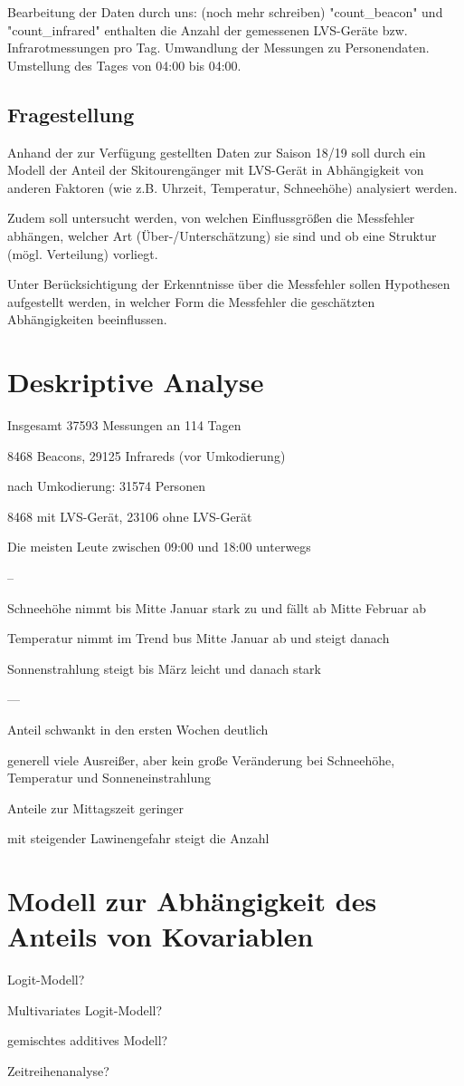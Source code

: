 \documentclass[11pt,a4paper]{report}
\begin{document}
Bearbeitung der Daten durch uns:
(noch mehr schreiben)
"count\_beacon" und "count\_infrared" enthalten die Anzahl der gemessenen LVS-Geräte bzw. Infrarotmessungen pro Tag.
Umwandlung der Messungen zu Personendaten. Umstellung des Tages von 04:00 bis 04:00.

\section{Fragestellung}
	\item Anhand der zur Verfügung gestellten Daten zur Saison 18/19 soll durch ein Modell der Anteil der Skitourengänger mit LVS-Gerät in Abhängigkeit von anderen Faktoren (wie z.B. Uhrzeit, Temperatur, Schneehöhe) analysiert werden.
\item Zudem soll untersucht werden, von welchen Einflussgrößen die Messfehler abhängen, welcher Art (Über-/Unterschätzung) sie sind und ob eine Struktur (mögl. Verteilung) vorliegt.
\item Unter Berücksichtigung der Erkenntnisse über die Messfehler sollen Hypothesen aufgestellt werden, in welcher Form die Messfehler die geschätzten Abhängigkeiten beeinflussen.





\chapter{Deskriptive Analyse}
Insgesamt 37593 Messungen an 114 Tagen

8468 Beacons, 29125 Infrareds (vor Umkodierung)

nach Umkodierung: 31574 Personen

8468 mit LVS-Gerät, 23106 ohne LVS-Gerät

Die meisten Leute zwischen 09:00 und 18:00 unterwegs

--

Schneehöhe nimmt bis Mitte Januar stark zu und fällt ab Mitte Februar ab

Temperatur nimmt im Trend bus Mitte Januar ab und steigt danach
 
Sonnenstrahlung steigt bis März leicht und danach stark


---


Anteil schwankt in den ersten Wochen deutlich

generell viele Ausreißer, aber kein große Veränderung bei Schneehöhe, Temperatur und Sonneneinstrahlung

Anteile zur Mittagszeit geringer

mit steigender Lawinengefahr steigt die Anzahl

\chapter{Modell zur Abhängigkeit des Anteils von Kovariablen}

Logit-Modell?

Multivariates Logit-Modell?

gemischtes additives Modell?

Zeitreihenanalyse?
	
	
\end{document}
